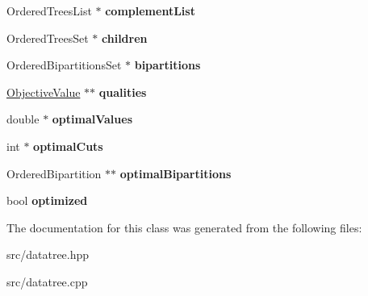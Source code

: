 \begin{DoxyCompactItemize}
\item 
\hypertarget{classOrderedDatatree_a63e87e1bdc0eaa3226eaad811a53bae6}{Ordered\-Trees\-List $\ast$ {\bfseries complement\-List}}\label{classOrderedDatatree_a63e87e1bdc0eaa3226eaad811a53bae6}

\item 
\hypertarget{classOrderedDatatree_ac13f35e59ddcf32a3b9ec11ec2a756d9}{Ordered\-Trees\-Set $\ast$ {\bfseries children}}\label{classOrderedDatatree_ac13f35e59ddcf32a3b9ec11ec2a756d9}

\item 
\hypertarget{classOrderedDatatree_a9bbd6bd520a9f0cf54da91c30b35c09e}{Ordered\-Bipartitions\-Set $\ast$ {\bfseries bipartitions}}\label{classOrderedDatatree_a9bbd6bd520a9f0cf54da91c30b35c09e}

\item 
\hypertarget{classOrderedDatatree_a3a1536573ceb5e61d8b271a1ebe9f44f}{\hyperlink{classObjectiveValue}{Objective\-Value} $\ast$$\ast$ {\bfseries qualities}}\label{classOrderedDatatree_a3a1536573ceb5e61d8b271a1ebe9f44f}

\item 
\hypertarget{classOrderedDatatree_a0bb2c4a9111b12dd2266ece96ffc836a}{double $\ast$ {\bfseries optimal\-Values}}\label{classOrderedDatatree_a0bb2c4a9111b12dd2266ece96ffc836a}

\item 
\hypertarget{classOrderedDatatree_a433aa570b06cb85e74b696b66a21c503}{int $\ast$ {\bfseries optimal\-Cuts}}\label{classOrderedDatatree_a433aa570b06cb85e74b696b66a21c503}

\item 
\hypertarget{classOrderedDatatree_a158f9eef6ebd0b9f66a15663f39439b5}{Ordered\-Bipartition $\ast$$\ast$ {\bfseries optimal\-Bipartitions}}\label{classOrderedDatatree_a158f9eef6ebd0b9f66a15663f39439b5}

\item 
\hypertarget{classOrderedDatatree_ac30581d76d9967d61ed9b5b66b1fb967}{bool {\bfseries optimized}}\label{classOrderedDatatree_ac30581d76d9967d61ed9b5b66b1fb967}

\end{DoxyCompactItemize}


The documentation for this class was generated from the following files\-:\begin{DoxyCompactItemize}
\item 
src/datatree.\-hpp\item 
src/datatree.\-cpp\end{DoxyCompactItemize}
